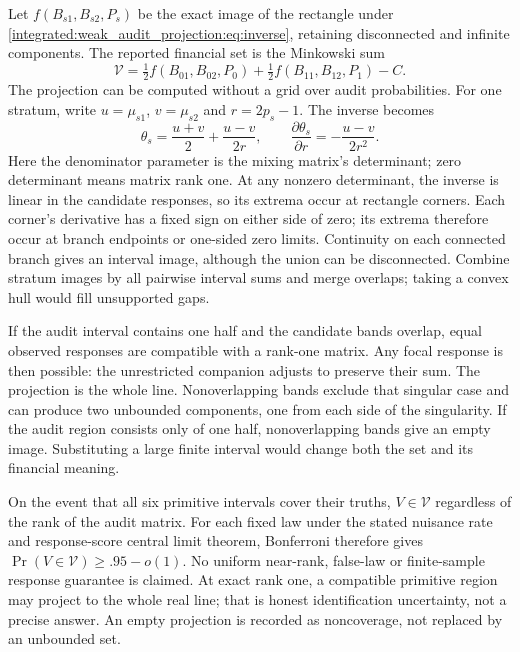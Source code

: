 Let $f(B_{s1},B_{s2},P_s)$ be the exact image of the rectangle under
\eqref{integrated:weak_audit_projection:eq:inverse}, retaining disconnected and infinite components. The
reported financial set is the Minkowski sum
\begin{equation}\label{integrated:weak_audit_projection:eq:set}
 \mathcal V=\tfrac12 f(B_{01},B_{02},P_0)
 +\tfrac12 f(B_{11},B_{12},P_1)-C.
\end{equation}
The projection can be computed without a grid over audit probabilities.
For one stratum, write $u=\mu_{s1}$, $v=\mu_{s2}$ and $r=2p_s-1$.
The inverse becomes
\begin{equation}\label{rel80:projection-corners}
 \theta_s=\frac{u+v}{2}+\frac{u-v}{2r},\qquad
 \frac{\partial\theta_s}{\partial r}=-\frac{u-v}{2r^2}.
\end{equation}
Here the denominator parameter is the mixing matrix's determinant; zero
determinant means matrix rank one. At any nonzero determinant, the inverse
is linear in the candidate responses, so its extrema occur at rectangle
corners. Each corner's derivative has a fixed sign on either side of zero;
its extrema therefore occur at branch endpoints or one-sided zero limits.
Continuity on each connected branch gives an interval image, although the
union can be disconnected. Combine stratum images by all pairwise interval
sums and merge overlaps; taking a convex hull would fill unsupported gaps.

If the audit interval contains one half and the candidate bands overlap,
equal observed responses are compatible with a rank-one matrix. Any focal
response is then possible: the unrestricted companion adjusts to preserve
their sum. The projection is the whole line. Nonoverlapping bands exclude
that singular case and can produce two unbounded components, one from each
side of the singularity. If the audit region consists only of one half,
nonoverlapping bands give an empty image. Substituting a large finite
interval would change both the set and its financial meaning.

On the event that all six primitive intervals cover their truths, $V\in
\mathcal V$ regardless of the rank of the audit matrix. For each fixed law
under the stated nuisance rate and response-score central limit theorem,
Bonferroni therefore gives $\Pr(V\in\mathcal V)\geq .95-o(1)$.
No uniform near-rank, false-law or finite-sample response guarantee is
claimed. At exact rank one, a compatible primitive region may project to the
whole real line; that is honest identification uncertainty, not a precise
answer. An empty projection is recorded as noncoverage, not replaced by an
unbounded set.

